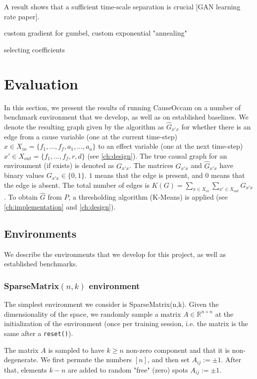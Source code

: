 \documentclass[a4paper,11pt,oneside]{report}
\newcommand{\sysname}{CauseOccam\xspace}
\begin{document}
A result shows that a sufficient time-scale separation is crucial [GAN learning rate paper].

custom gradient for gumbel, custom exponential "annealing"

selecting coefficients



\chapter{Evaluation}
\label{ch:evaluation}
In this section, we present the results of running \sysname on a number of benchmark environment that we develop, as well as on established baselines.
We denote the resulting graph given by the algorithm as $\hat{G}_{x'x}$ for whether there is an edge from a cause variable (one at the current time-step) $x\in X_{in}=\{f_1,...,f_f,a_1,...,a_a\}$ to an effect variable (one at the next time-step) $x'\in X_{out}=\{f_1,...,f_f,r,d\}$ (see \autoref{ch:design}). The true causal graph for an environment (if exists) is denoted as $G_{x'x}$. The matrices $G_{x'x}$ and $\hat{G}_{x'x}$ have binary values $G_{x'x}\in\{0,1\}$. $1$ means that the edge is present, and $0$ means that the edge is absent. The total number of edges is $K(G)=\sum\limits_{x\in X_{in}}\sum\limits_{x'\in X_{out}}G_{x'x}$. To obtain $\hat{G}$ from $P$, a thresholding algorithm (K-Means) is applied (see \autoref{ch:implementation} and \autoref{ch:design}).

\section{Environments}
We describe the environments that we develop for this project, as well as established benchmarks.

\subsection{SparseMatrix$(n,k)$ environment}
The simplest environment we consider is SparseMatrix(n,k). Given the dimensionality of the space, we randomly sample a matrix $A\in \mathbb R^{n\times n}$ at the initialization of the environment (once per training session, i.e. the matrix is the same after a {\tt reset()}).

The matrix $A$ is sampled to have $k\geq n$ non-zero component and that it is non-degenerate. We first permute the numbers $[n]$, and then set $A_{ij}:=\pm 1$.
After that, elements $k-n$ are added to random "free" (zero) spots $A_{ij}:=\pm 1$.
\end{document}
